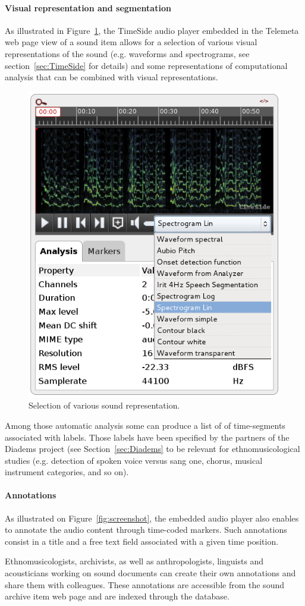 \documentclass{sig-alternate}
\begin{document}
\paragraph{Visual representation and segmentation}
As illustrated in Figure~\ref{fig:sound_representation}, the TimeSide audio player embedded in the Telemeta web page view of a sound item allows for a selection of various visual representations of the sound (e.g. waveforms and spectrograms, see section~\ref{sec:TimeSide} for details) and some representations of computational analysis that can be combined with visual representations.
\begin{figure}[htb]
  \centering
  \includegraphics[width=0.5\linewidth]{img/sound_representation.png}
  \caption{Selection of various sound representation.}
  \label{fig:sound_representation}
\end{figure}
Among those automatic analysis some can produce a list of of time-segments associated with labels.
Those labels have been specified by the partners of the Diadems project (see Section~\ref{sec:Diadems} to be relevant for ethnomusicological studies (e.g. detection of spoken voice versus sang one, chorus, musical instrument categories, and so on).



\paragraph{Annotations}
As illustrated on Figure~\ref{fig:screenshot}, the embedded audio player also enables to annotate the audio content through time-coded markers.
Such annotations consist in a title and a free text field associated with a given time position.

Ethnomusicologists, archivists, as well as anthropologists, linguists and acousticians working on sound documents can create their own annotations and share them with colleagues. These annotations are accessible from the sound archive item web page and are indexed through the database.
\end{document}

